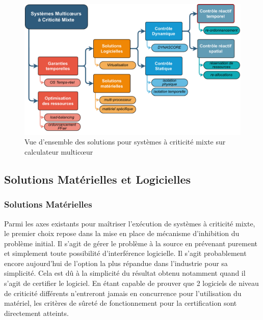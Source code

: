 \documentclass[french, a4paper, 11pt, twoside, pdftex]{StyleThese}
\begin{document}
    \begin{figure}[ht]
    	\centering
    	\includegraphics[width=\linewidth]{schemas/StateOfTheArt_plan}
    	\captionsetup{justification=centering}
    	\caption[Classification État de l'Art Systèmes à criticité mixte sur multicœur]
    			{Vue d'ensemble des solutions pour systèmes à criticité mixte sur calculateur multicœur}
    	\label{fig:stateoftheartsituation}
    \end{figure}

    \subsection{Solutions Matérielles et Logicielles}
    
    \subsubsection{Solutions Matérielles}
    Parmi les axes existants pour maîtriser l'exécution de systèmes à criticité mixte, le premier choix repose dans la mise en place de mécanisme d'inhibition du problème initial. Il s'agit de gérer le problème à la source en prévenant purement et simplement toute possibilité d'interférence logicielle. Il s'agit probablement encore aujourd'hui de l'option la plus répandue dans l'industrie pour sa simplicité. Cela est dû à la simplicité du résultat obtenu notamment quand il s'agit de certifier le logiciel. En étant capable de prouver que 2 logiciels de niveau de criticité différents n'entreront jamais en concurrence pour l'utilisation du matériel, les critères de sûreté de fonctionnement pour la certification sont directement atteints.
    
\end{document}
